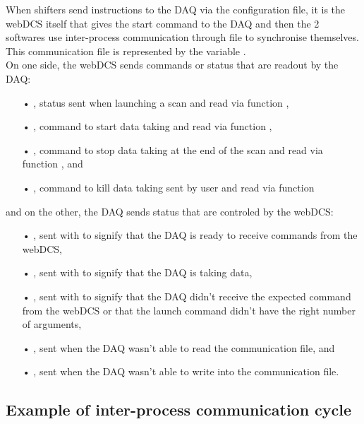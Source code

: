     When shifters send instructions to the DAQ via the configuration file, it is the webDCS itself that gives the start command to the DAQ and then the 2 softwares use inter-process communication through file to synchronise themselves. This communication file is represented by the variable .\\
    On one side, the webDCS sends commands or status that are readout by the DAQ:
    \begin{itemize}
    	\item[•] , status sent when launching a scan and read via function ,
    	\item[•] , command to start data taking and read via function ,
    	\item[•] , command to stop data taking at the end of the scan and read via function , and
    	\item[•] , command to kill data taking sent by user and read via function 
    \end{itemize}
and on the other, the DAQ sends status that are controled by the webDCS:
    \begin{itemize}
    	\item[•] , sent with  to signify that the DAQ is ready to receive commands from the webDCS,
    	\item[•] , sent with  to signify that the DAQ is taking data,
    	\item[•] , sent with  to signify that the DAQ didn't receive the expected command from the webDCS or that the launch command didn't have the right number of arguments,
    	\item[•] , sent when the DAQ wasn't able to read the communication file, and
    	\item[•] , sent when the DAQ wasn't able to write into the communication file.
    \end{itemize}
    
    \subsection{Example of inter-process communication cycle}
    \label{app1:ssec:commex}
    
